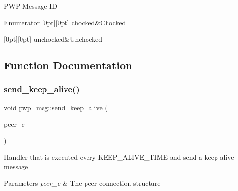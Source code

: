 P\+WP Message ID \begin{DoxyEnumFields}{Enumerator}
[0pt][0pt]{}\mbox{\label{namespacepwp__msg_a0b9a29508f00a30e5138d2b78f4b1dafae1d8b3754d66ec7fcad827fb54eaeea2}} 
chocked&Chocked \\
\hline

[0pt][0pt]{}\mbox{\label{namespacepwp__msg_a0b9a29508f00a30e5138d2b78f4b1dafa55689e288bf71e7737faaf385b1c528b}} 
unchocked&Unchocked \\
\hline

\end{DoxyEnumFields}


\subsection{Function Documentation}
\mbox{\label{namespacepwp__msg_a705398f44211d9aa47d9559c5fb405e1}} 
\subsubsection{\texorpdfstring{send\+\_\+keep\+\_\+alive()}{send\_keep\_alive()}}
{\footnotesize\ttfamily void pwp\+\_\+msg\+::send\+\_\+keep\+\_\+alive (\begin{DoxyParamCaption}\item[{const \hyperlink{structpwp_1_1peer__connection}{pwp\+::peer\+\_\+connection} \&}]{peer\+\_\+c }\end{DoxyParamCaption})}

Handler that is executed every K\+E\+E\+P\+\_\+\+A\+L\+I\+V\+E\+\_\+\+T\+I\+ME and send a keep-\/alive message


\begin{DoxyParams}{Parameters}
{\em peer\+\_\+c} & The peer connection structure \\
\hline
\end{DoxyParams}


